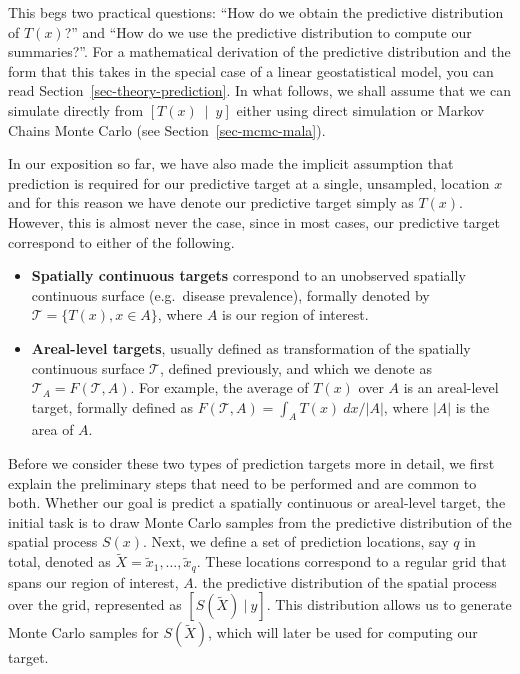 \documentclass[
  letterpaper,
]{krantz}
\begin{document}
This begs two practical questions: ``How do we obtain the predictive
distribution of \(T(x)\)?'' and ``How do we use the predictive
distribution to compute our summaries?''. For a mathematical derivation
of the predictive distribution and the form that this takes in the
special case of a linear geostatistical model, you can read
Section~\ref{sec-theory-prediction}. In what follows, we shall assume
that we can simulate directly from \([T(x) \: \mid \: y]\) either using
direct simulation or Markov Chains Monte Carlo (see
Section~\ref{sec-mcmc-mala}).

In our exposition so far, we have also made the implicit assumption that
prediction is required for our predictive target at a single, unsampled,
location \(x\) and for this reason we have denote our predictive target
simply as \(T(x)\). However, this is almost never the case, since in
most cases, our predictive target correspond to either of the following.

\begin{itemize}
\item
  \textbf{Spatially continuous targets} correspond to an unobserved
  spatially continuous surface (e.g.~disease prevalence), formally
  denoted by \(\mathcal{T} = \{T(x), x \in A\}\), where \(A\) is our
  region of interest.
\item
  \textbf{Areal-level targets}, usually defined as transformation of the
  spatially continuous surface \(\mathcal{T}\), defined previously, and
  which we denote as \(\mathcal{T}_{A} = F(\mathcal{T}, A)\). For
  example, the average of \(T(x)\) over \(A\) is an areal-level target,
  formally defined as \(F(\mathcal{T}, A) = \int_{A} T(x) \: dx / |A|\),
  where \(|A|\) is the area of \(A\).
\end{itemize}

Before we consider these two types of prediction targets more in detail,
we first explain the preliminary steps that need to be performed and are
common to both. Whether our goal is predict a spatially continuous or
areal-level target, the initial task is to draw Monte Carlo samples from
the predictive distribution of the spatial process \(S(x)\). Next, we
define a set of prediction locations, say \(q\) in total, denoted as
\(\tilde{X} = {\tilde{x}_1, \ldots, \tilde{x}_q}\). These locations
correspond to a regular grid that spans our region of interest, \(A\).
the predictive distribution of the spatial process over the grid,
represented as \([S(\tilde{X}) \: |\: y]\). This distribution allows us
to generate Monte Carlo samples for \(S(\tilde{X})\), which will later
be used for computing our target.
\end{document}
